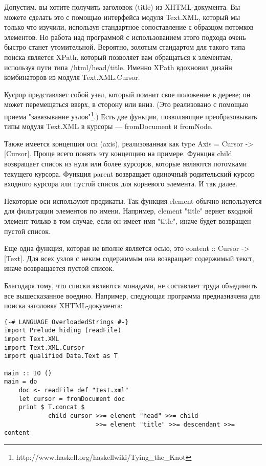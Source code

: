 Допустим, вы хотите получить заголовок (title) из XHTML-документа. Вы можете сделать это с помощью интерфейса модуля Text.XML, который мы только что изучили, используя стандартное сопоставление с образцом потомков элементов. Но работа над программой с использованием этого подхода очень быстро станет утомительной. Вероятно, золотым стандартом для такого типа поиска является XPath, который позволяет вам обращаться к элементам, используя пути типа /html/head/title. Именно XPath вдохновил дизайн комбинаторов из модуля Text.XML.Cursor.

Кусрор представляет собой узел, который помнит свое положение в дереве; он может перемещаться вверх, в сторону или вниз. (Это реализовано с помощью приема "завязывание узлов"\footnote{http://www.haskell.org/haskellwiki/Tying\_the\_Knot}.) Есть две функции, позволяющие преобразовывать типы модуля Text.XML в курсоры --- fromDocument и fromNode.

Также имеется концепция оси (axis), реализованная как type Axis = Cursor -> [Cursor]. Проще всего понять эту концепцию на примере. Функция child возвращает список из нуля или более курсоров, которые являются потомками текущего курсора. Функция parent возвращает одиночный родительский курсор входного курсора или пустой список для корневого элемента. И так далее.

Некоторые оси используют предикаты. Так функция element обычно используется для фильтрации элементов по имени. Например, element "title" вернет входной элемент только в том случае, если он имеет имя "title", иначе будет возвращен пустой список.

Еще одна функция, которая не вполне является осью, это content :: Cursor -> [Text]. Для всех узлов с неким содержимым она возвращает содержимый текст, иначе возвращается пустой список.

Благодаря тому, что списки являются монадами, не составляет труда объединить все вышесказанное воедино. Например, следующая программа предназначена для поиска заголовка XHTML-документа:

\begin{lstlisting}
{-# LANGUAGE OverloadedStrings #-}
import Prelude hiding (readFile)
import Text.XML
import Text.XML.Cursor
import qualified Data.Text as T

main :: IO ()
main = do
    doc <- readFile def "test.xml"
    let cursor = fromDocument doc
    print $ T.concat $
            child cursor >>= element "head" >>= child
                         >>= element "title" >>= descendant >>= content
\end{lstlisting}

